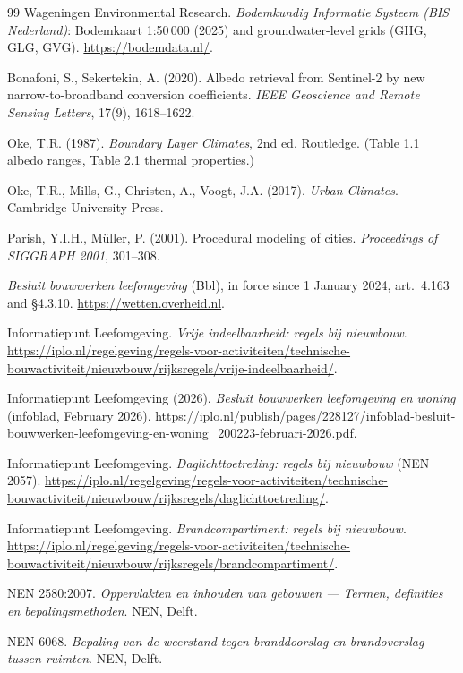 \documentclass[11pt]{article}
\begin{document}
\begin{thebibliography}{99}
 Wageningen Environmental Research. \textit{Bodemkundig Informatie Systeem (BIS Nederland)}: Bodemkaart 1:50\,000 (2025) and groundwater-level grids (GHG, GLG, GVG). \url{https://bodemdata.nl/}.

 Bonafoni, S., Sekertekin, A. (2020). Albedo retrieval from Sentinel-2 by new narrow-to-broadband conversion coefficients. \textit{IEEE Geoscience and Remote Sensing Letters}, 17(9), 1618--1622.

 Oke, T.R. (1987). \textit{Boundary Layer Climates}, 2nd ed. Routledge. (Table 1.1 albedo ranges, Table 2.1 thermal properties.)

 Oke, T.R., Mills, G., Christen, A., Voogt, J.A. (2017). \textit{Urban Climates}. Cambridge University Press.

 Parish, Y.I.H., M\"uller, P. (2001). Procedural modeling of cities. \textit{Proceedings of SIGGRAPH 2001}, 301--308.

 \textit{Besluit bouwwerken leefomgeving} (Bbl), in force since 1 January 2024, art.\ 4.163 and \S4.3.10. \url{https://wetten.overheid.nl}.

 Informatiepunt Leefomgeving. \textit{Vrije indeelbaarheid: regels bij nieuwbouw}. \url{https://iplo.nl/regelgeving/regels-voor-activiteiten/technische-bouwactiviteit/nieuwbouw/rijksregels/vrije-indeelbaarheid/}.

 Informatiepunt Leefomgeving (2026). \textit{Besluit bouwwerken leefomgeving en woning} (infoblad, February 2026). \url{https://iplo.nl/publish/pages/228127/infoblad-besluit-bouwwerken-leefomgeving-en-woning_200223-februari-2026.pdf}.

 Informatiepunt Leefomgeving. \textit{Daglichttoetreding: regels bij nieuwbouw} (NEN 2057). \url{https://iplo.nl/regelgeving/regels-voor-activiteiten/technische-bouwactiviteit/nieuwbouw/rijksregels/daglichttoetreding/}.

 Informatiepunt Leefomgeving. \textit{Brandcompartiment: regels bij nieuwbouw}. \url{https://iplo.nl/regelgeving/regels-voor-activiteiten/technische-bouwactiviteit/nieuwbouw/rijksregels/brandcompartiment/}.

 NEN 2580:2007. \textit{Oppervlakten en inhouden van gebouwen --- Termen, definities en bepalingsmethoden}. NEN, Delft.

 NEN 6068. \textit{Bepaling van de weerstand tegen branddoorslag en brandoverslag tussen ruimten}. NEN, Delft.


\end{thebibliography}
\end{document}
